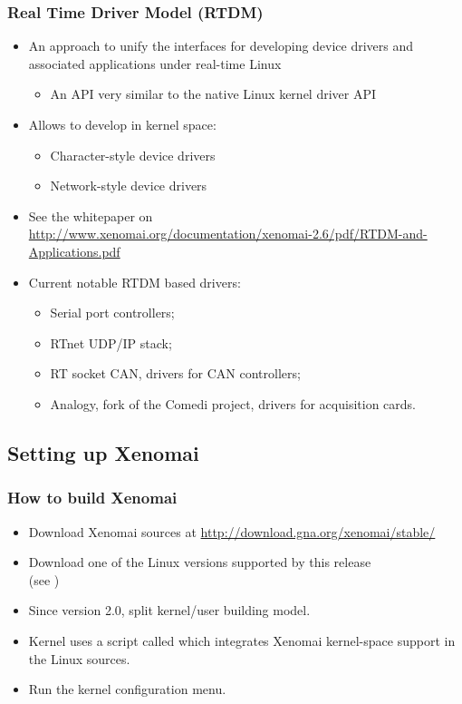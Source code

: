 \begin{frame}
  \frametitle{Real Time Driver Model (RTDM)}
  \begin{itemize}
  \item An approach to unify the interfaces for developing device
    drivers and associated applications under real-time Linux
    \begin{itemize}
    \item An API very similar to the native Linux kernel driver API
    \end{itemize}
  \item Allows to develop in kernel space:
    \begin{itemize}
    \item Character-style device drivers
    \item Network-style device drivers
    \end{itemize}
  \item See the whitepaper on\\
    \url{http://www.xenomai.org/documentation/xenomai-2.6/pdf/RTDM-and-Applications.pdf}
  \item Current notable RTDM based drivers:
    \begin{itemize}
    \item Serial port controllers;
    \item RTnet UDP/IP stack;
    \item RT socket CAN, drivers for CAN controllers;
    \item Analogy, fork of the Comedi project, drivers for acquisition cards.
    \end{itemize}
  \end{itemize}
\end{frame}

\subsection{Setting up Xenomai}

\begin{frame}
  \frametitle{How to build Xenomai}
  \begin{itemize}
  \item Download Xenomai sources at \url{http://download.gna.org/xenomai/stable/}
  \item Download one of the Linux versions supported by this release\\
    (see )
  \item Since version 2.0, split kernel/user building model.
  \item Kernel uses a script called 
    which integrates Xenomai kernel-space support in the Linux
    sources.
  \item Run the kernel configuration menu.
  \end{itemize}
\end{frame}

